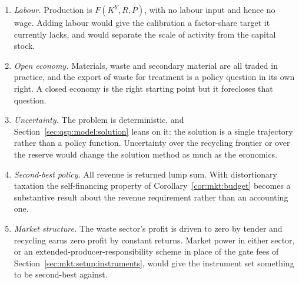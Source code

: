 \begin{enumerate}[leftmargin=2.2em,itemsep=0.25em]
\item \emph{Labour.} Production is $F\left(K^Y,R,P\right)$, with no labour input and hence no wage.
Adding labour would give the calibration a factor-share target it currently lacks, and would separate
the scale of activity from the capital stock.

\item \emph{Open economy.} Materials, waste and secondary material are all traded in practice, and the
export of waste for treatment is a policy question in its own right. A closed economy is the right
starting point but it forecloses that question.

\item \emph{Uncertainty.} The problem is deterministic, and Section~\ref{sec:qsp:model:solution} leans
on it: the solution is a single trajectory rather than a policy function. Uncertainty over the
recycling frontier or over the reserve would change the solution method as much as the economics.

\item \emph{Second-best policy.} All revenue is returned lump sum. With distortionary taxation the
self-financing property of Corollary~\ref{cor:mkt:budget} becomes a substantive result about the
revenue requirement rather than an accounting one.

\item \emph{Market structure.} The waste sector's profit is driven to zero by tender and recycling
earns zero profit by constant returns. Market power in either sector, or an
extended-producer-responsibility scheme in place of the gate fees of
Section~\ref{sec:mkt:setup:instruments}, would give
the instrument set something to be second-best against.
\end{enumerate}
